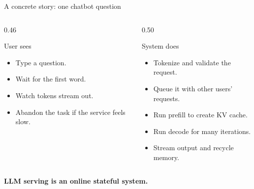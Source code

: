 \documentclass[aspectratio=169,11pt]{beamer}
\newcommand{\term}[1]{\textcolor{HUSTBlue}{\textbf{#1}}}
\begin{document}
\begin{frame}{A concrete story: one chatbot question}
  \begin{columns}[T,totalwidth=\textwidth]
    \begin{column}{0.46\textwidth}
      \begin{block}{User sees}
        \begin{itemize}
          \item Type a question.
          \item Wait for the first word.
          \item Watch tokens stream out.
          \item Abandon the task if the service feels slow.
        \end{itemize}
      \end{block}
    \end{column}
    \begin{column}{0.50\textwidth}
      \begin{block}{System does}
        \begin{itemize}
          \item Tokenize and validate the request.
          \item Queue it with other users' requests.
          \item Run prefill to create KV cache.
          \item Run decode for many iterations.
          \item Stream output and recycle memory.
        \end{itemize}
      \end{block}
    \end{column}
  \end{columns}
  \vspace{0.16cm}
  \begin{center}
    \normalsize\term{LLM serving is an online stateful system.}
  \end{center}
\end{frame}
\end{document}
